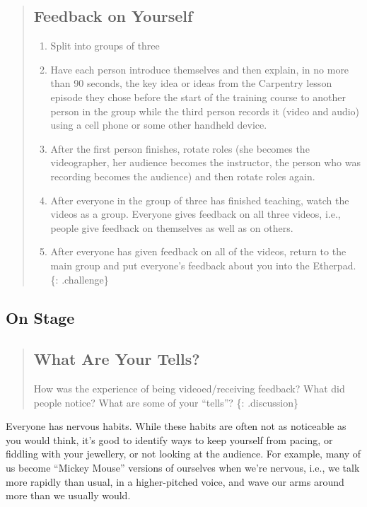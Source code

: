 \begin{quote}
\subsection{Feedback on Yourself}\label{feedback-on-yourself}

\begin{enumerate}
\def\labelenumi{\arabic{enumi}.}
\itemsep1pt\parskip0pt
\item
  Split into groups of three
\item
  Have each person introduce themselves and then explain, in no more
  than 90 seconds, the key idea or ideas from the Carpentry lesson
  episode they chose before the start of the training course to another
  person in the group while the third person records it (video and
  audio) using a cell phone or some other handheld device.
\item
  After the first person finishes, rotate roles (she becomes the
  videographer, her audience becomes the instructor, the person who was
  recording becomes the audience) and then rotate roles again.
\item
  After everyone in the group of three has finished teaching, watch the
  videos as a group. Everyone gives feedback on all three videos, i.e.,
  people give feedback on themselves as well as on others.
\item
  After everyone has given feedback on all of the videos, return to the
  main group and put everyone's feedback about you into the Etherpad.
  \{: .challenge\}
\end{enumerate}
\end{quote}

\subsection{On Stage}\label{on-stage}

\begin{quote}
\subsection{What Are Your Tells?}\label{what-are-your-tells}

How was the experience of being videoed/receiving feedback? What did
people notice? What are some of your ``tells''? \{: .discussion\}
\end{quote}

Everyone has nervous habits. While these habits are often not as
noticeable as you would think, it's good to identify ways to keep
yourself from pacing, or fiddling with your jewellery, or not looking at
the audience. For example, many of us become ``Mickey Mouse'' versions
of ourselves when we're nervous, i.e., we talk more rapidly than usual,
in a higher-pitched voice, and wave our arms around more than we usually
would.

